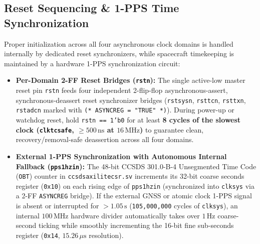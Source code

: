 \documentclass[10pt,a4paper]{article}
\renewcommand{\_}{\origunderscore\penalty0\hskip0pt\relax}
\numberwithin{table}{section}
\numberwithin{figure}{section}
\numberwithin{equation}{section}
\begin{document}
\subsection{Reset Sequencing \& 1-PPS Time Synchronization}
Proper initialization across all four asynchronous clock domains is handled internally by dedicated reset synchronizers, while spacecraft timekeeping is maintained by a hardware 1-PPS synchronization circuit:
\begin{itemize}\setlength{\itemsep}{2.5pt}
    \item \textbf{Per-Domain 2-FF Reset Bridges (\texttt{rst\_n}):} The single active-low master reset pin \texttt{rst\_n} feeds four independent 2-flip-flop asynchronous-assert, synchronous-deassert reset synchronizer bridges (\texttt{rst\_sys\_n}, \texttt{rst\_tc\_n}, \texttt{rst\_tx\_n}, \texttt{rst\_adc\_n} marked with \texttt{(* ASYNC\_REG = "TRUE" *)}). During power-up or watchdog reset, hold \texttt{rst\_n == 1'b0} for at least \textbf{8 cycles of the slowest clock (\texttt{clk\_tc\_safe}, $\ge 500\,\text{ns}$ at $16\,\text{MHz}$)} to guarantee clean, recovery/removal-safe deassertion across all four domains.
    \item \textbf{External 1-PPS Synchronization with Autonomous Internal Fallback (\texttt{pps\_1hz\_in}):} The 48-bit CCSDS 301.0-B-4 Unsegmented Time Code (\texttt{OBT}) counter in \texttt{ccsds\_axi\_lite\_csr.sv} increments its 32-bit coarse seconds register (\texttt{0x10}) on each rising edge of \texttt{pps\_1hz\_in} (synchronized into \texttt{clk\_sys} via a 2-FF \texttt{ASYNC\_REG} bridge). If the external GNSS or atomic clock 1-PPS signal is absent or interrupted for $>1.05\,\text{s}$ (\texttt{105,000,000} cycles of \texttt{clk\_sys}), an internal $100\,\text{MHz}$ hardware divider automatically takes over $1\,\text{Hz}$ coarse-second ticking while smoothly incrementing the 16-bit fine sub-seconds register (\texttt{0x14}, $15.26\,\mu\text{s}$ resolution).
\end{itemize}
\end{document}
